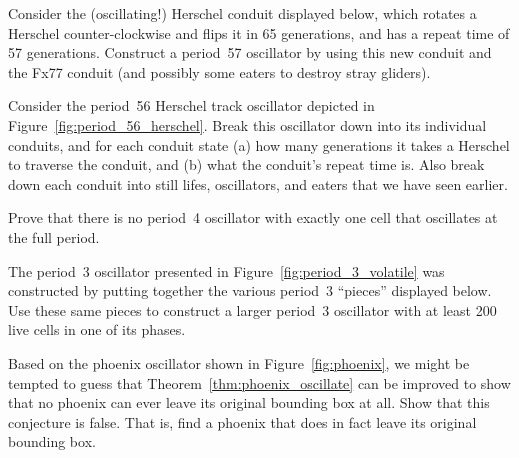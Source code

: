 \begin{multicols}{2}
	
	\mfilbreak
	
	
	\begin{problem}\label{exer:period_57_herschel}
		Consider the (oscillating!) Herschel conduit displayed below, which rotates a Herschel counter-clockwise and flips it in 65 generations, and has a repeat time of 57 generations. Construct a period~57 oscillator by using this new conduit and the Fx77 conduit (and possibly some eaters to destroy stray gliders).
		\begin{center}
		\end{center}
	\end{problem}

	
	\mfilbreak
	
	
	\begin{problem}\label{exer:period_56_herschel}
		Consider the period~56 Herschel track oscillator depicted in Figure~\ref{fig:period_56_herschel}. Break this oscillator down into its individual conduits, and for each conduit state (a) how many generations it takes a Herschel to traverse the conduit, and (b) what the conduit's repeat time is. Also break down each conduit into still lifes, oscillators, and eaters that we have seen earlier.
	\end{problem}
	
	
	\mfilbreak
	
	
	\begin{problemstar}\label{exer:p4_oscillator}
		Prove that there is no period~4 oscillator with exactly one cell that oscillates at the full period. %
	\end{problemstar}
	
	
	\mfilbreak
	
	
	\begin{problemstar}\label{exer:period_3_volatile}
		The period~3 oscillator presented in Figure~\ref{fig:period_3_volatile} was constructed by putting together the various period~3 ``pieces'' displayed below. Use these same pieces to construct a larger period~3 oscillator with at least 200 live cells in one of its phases.
		\begin{center}
		\end{center}
	\end{problemstar}
	
	
	\mfilbreak
	
	
	\begin{problemstar}\label{exer:phoenix_bb}
		Based on the phoenix oscillator shown in Figure~\ref{fig:phoenix}, we might be tempted to guess that Theorem~\ref{thm:phoenix_oscillate} can be improved to show that no phoenix can ever leave its original bounding box at all. Show that this conjecture is false. That is, find a phoenix that does in fact leave its original bounding box.
	\end{problemstar}
	
\end{multicols}
\normalsize\vspace*{0.01cm}
